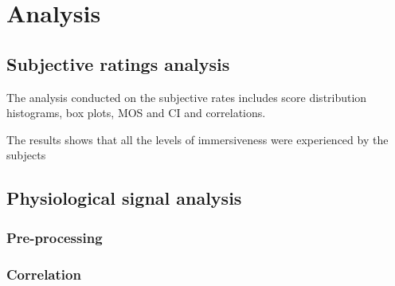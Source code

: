 \section{Analysis}

\subsection{Subjective ratings analysis}
The analysis conducted on the subjective rates includes score distribution histograms, box plots, \ac{MOS} and \ac{CI} and correlations. 



The results shows that all the levels of immersiveness were experienced by the subjects




\subsection{Physiological signal analysis}

\subsubsection{Pre-processing}

\subsubsection{Correlation}